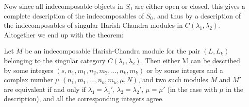 Now since all indecomposable objects in $S_0$ are either open or closed, this gives a complete description of the indecomposables of $S_0$, and thus by  a description of the indecomposables of singular Harish-Chandra modules in $C(\lambda_1,\lambda_2)$. Altogether we end up with the theorem:
\begin{theorem}
  Let $M$ be an indecomposable Harish-Chandra module for the pair $(L,L_k)$ belonging to the singular category $C(\lambda_1,\lambda_2)$. Then either M can be described by some integers $(s,n_1,m_1,n_2,m_2,\dotsc,n_k,m_k)$ or by some integers and a complex number $\mu$ $(n_1,m_1,\dotsc,n_k,m_k,\mu,N)$, and two such modules $M$ and $M'$ are equivalent if and only if $\lambda_1=\lambda_1'$, $\lambda_2=\lambda_2'$, $\mu=\mu'$ (in the case with $\mu$ in the description), and all the corresponding integers agree.  
\end{theorem}

